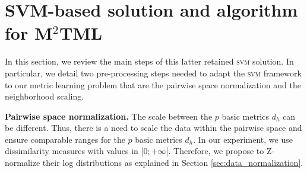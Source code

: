 \section{SVM-based solution and algorithm for M$^2$TML}
\noindent In this section, we review the main steps of this latter retained \textsc{svm} solution. In particular, we detail two pre-processing steps needed to adapt the \textsc{svm} framework to our metric learning problem that are the pairwise space normalization and the neighborhood scaling.

\noindent \textbf{Pairwise space normalization.} 
The scale between the $p$ basic metrics $d_h$ can be different. Thus, there is a need to scale the data within the pairwise space and ensure comparable ranges for the $p$ basic metrics $d_h$. In our experiment, we use dissimilarity measures with values in $[0;+\infty[$. Therefore, we propose to Z-normalize their log distributions as explained in Section \ref{sec:data_normalization}. \\

